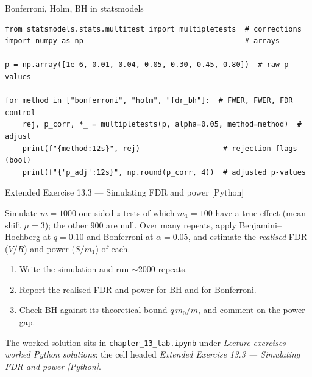 \documentclass[aspectratio=169,11pt]{beamer}
\begin{document}

\begin{frame}[fragile]{Bonferroni, Holm, BH in statsmodels}
  \begin{lstlisting}
from statsmodels.stats.multitest import multipletests  # corrections
import numpy as np                                     # arrays

p = np.array([1e-6, 0.01, 0.04, 0.05, 0.30, 0.45, 0.80])  # raw p-values

for method in ["bonferroni", "holm", "fdr_bh"]:  # FWER, FWER, FDR control
    rej, p_corr, *_ = multipletests(p, alpha=0.05, method=method)  # adjust
    print(f"{method:12s}", rej)                   # rejection flags (bool)
    print(f"{'p_adj':12s}", np.round(p_corr, 4))  # adjusted p-values
  \end{lstlisting}
\end{frame}

\begin{frame}{Extended Exercise 13.3 --- Simulating FDR and power [Python]}
\begin{longexercise}
  Simulate $m=1000$ one-sided $z$-tests of which $m_1=100$ have a true effect
  (mean shift $\mu=3$); the other $900$ are null. Over many repeats, apply
  Benjamini--Hochberg at $q=0.10$ and Bonferroni at $\alpha=0.05$, and estimate the
  \emph{realised} FDR ($V/R$) and power ($S/m_1$) of each.
  \begin{enumerate}
    \item Write the simulation and run $\sim2000$ repeats.
    \item Report the realised FDR and power for BH and for Bonferroni.
    \item Check BH against its theoretical bound $q\,m_0/m$, and comment on the power gap.
  \end{enumerate}
\end{longexercise}
\begin{labnote}
  The worked solution sits in \texttt{chapter\_13\_lab.ipynb} under
  \emph{Lecture exercises --- worked Python solutions}: the cell headed
  \emph{Extended Exercise 13.3 --- Simulating FDR and power [Python]}.
\end{labnote}
\end{frame}
\end{document}
